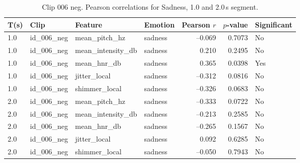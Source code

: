 \begin{table}[ht]
  \centering
  \begin{tabular}{l l l l r r l}
    \toprule
    T(s) & Clip           & Feature             & Emotion & Pearson $r$ & $p$-value & Significant \\
    \midrule
    1.0 & id\_006\_neg & mean\_pitch\_hz     & sadness & –0.069 & 0.7073 & No  \\
    1.0 & id\_006\_neg & mean\_intensity\_db & sadness &  0.210 & 0.2495 & No  \\
    1.0 & id\_006\_neg & mean\_hnr\_db       & sadness &  0.365 & 0.0398 & Yes \\
    1.0 & id\_006\_neg & jitter\_local       & sadness & –0.312 & 0.0816 & No  \\
    1.0 & id\_006\_neg & shimmer\_local      & sadness & –0.326 & 0.0683 & No  \\
    2.0 & id\_006\_neg & mean\_pitch\_hz     & sadness & –0.333 & 0.0722 & No \\
    2.0 & id\_006\_neg & mean\_intensity\_db & sadness & –0.213 & 0.2585 & No \\
    2.0 & id\_006\_neg & mean\_hnr\_db       & sadness & –0.265 & 0.1567 & No \\
    2.0 & id\_006\_neg & jitter\_local       & sadness &  0.092 & 0.6285 & No \\
    2.0 & id\_006\_neg & shimmer\_local      & sadness & –0.050 & 0.7943 & No \\
    \bottomrule
  \end{tabular}
  \caption{Clip 006 neg. Pearson correlations for Sadness, 1.0 and 2.0\,s segment.}
  \label{tab:pearson_sadness_2s_006neg}
\end{table}

